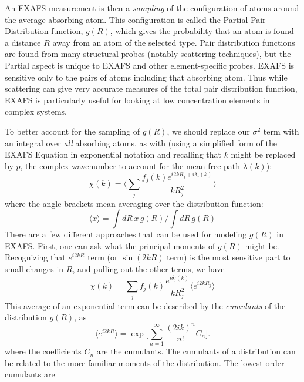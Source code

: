 An EXAFS measurement is then a {\emph{sampling}} of the configuration of
atoms around the average absorbing atom.  This configuration is called the
Partial Pair Distribution function, $g(R)$, which gives the probability that
an atom is found a distance $R$ away from an atom of the selected type.
Pair distribution functions are found from many structural probes (notably
scattering techniques), but the Partial aspect is unique to EXAFS and other
element-specific probes.  EXAFS is sensitive only to the pairs of atoms
including that absorbing atom.  Thus while scattering can give very
accurate measures of the total pair distribution function, EXAFS is
particularly useful for looking at low concentration elements in complex
systems.

To better account for the sampling of $g(R)$, we should replace our
$\sigma^2$ term with an integral over {\emph{all}} absorbing atoms, as with
(using a simplified form of the EXAFS Equation in exponential notation and
recalling that $k$ might be replaced by $p$, the complex wavenumber to
account for the mean-free-path $\lambda(k)$):
\begin{equation}
    \chi(k)  = \Biggl\langle \sum_j {\frac{f_j(k)e^{i2kR_j + i\delta_j(k)}}{kR_j^2}} \Biggr\rangle
\end{equation}
\noindent
where the angle brackets mean averaging over the distribution function:
\begin{equation*}
  \langle x \rangle = \int dR\, x \, g(R) / \int dR\, g(R)
\end{equation*}
\noindent
There are a few different approaches that can be used for modeling $g(R)$
in EXAFS.  First, one can ask what the principal moments of $g(R)$ might be.
Recognizing that $e^{i2kR}$ term (or $\sin(2kR)$
term) is the most sensitive part to small changes in $R$, and pulling out the
other terms, we have
\begin{equation}
    \chi(k)  =   \sum_j {f_j(k){\frac{e^{ i\delta_j(k)} }{kR_j^2}}}   \biggl\langle e^{i2kR_j}  \biggr\rangle
\end{equation}
\noindent
This average of an exponential term can be described by the
{\emph{cumulants}} of the distribution
$g(R)$, as
\begin{equation*}
  \biggl\langle e^{i2kR} \biggr\rangle = \exp \bigg[ \sum_{n=1}^{\infty} { \frac{(2ik)^n}{n!}}C_n  \bigg].
\end{equation*}
\noindent where the coefficients $C_n$ are the cumulants.
The cumulants of a distribution can be related to the more familiar moments
of the distribution.  The lowest order cumulants are
